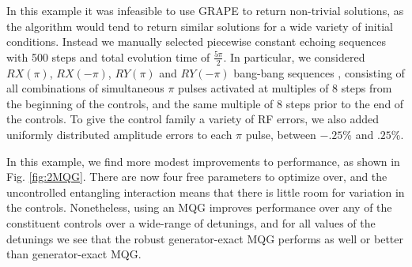 \documentclass[aps,nofootinbib,pra,notitlepage,twocolumn]{revtex4-1}
\newcommand{\0}{\ensuremath{\mathbf{0}}}
\begin{document}
{In this example it was infeasible to use GRAPE to return non-trivial solutions, as the algorithm would tend to return similar solutions for a wide variety of initial conditions. Instead we manually selected piecewise constant echoing sequences with 500 steps and total evolution time of $\frac{5\pi}{2}$. In particular, we considered $RX(\pi)$, $RX(-\pi)$, $RY(\pi)$ and $RY(-\pi)$ bang-bang sequences \cite{bangbang}, consisting of all combinations of simultaneous $\pi$ pulses activated at multiples of $8$ steps from the beginning of the controls, and the same multiple of $8$ steps prior to the end of the controls. To give the control family a variety of RF errors, we also added uniformly distributed amplitude errors to each $\pi$ pulse, between $-.25$\% and $.25$\%.

In this example, we find more modest improvements to performance, as shown in Fig. \ref{fig:2MQG}. There are now four free parameters to optimize over, and the uncontrolled entangling interaction means that there is little room for variation in the controls. Nonetheless, using an MQG improves performance over any of the constituent controls over a wide-range of detunings, and for all values of the detunings we see that the robust generator-exact MQG performs as well or better than generator-exact MQG.

}
\end{document}
